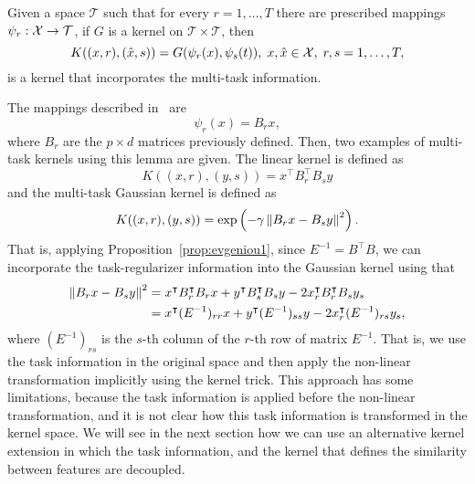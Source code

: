 \begin{lemma}\label{lemma:evgeniou_2}
    Given a space $\mathcal{T}$ such that for every $r=1, \ldots, T$  there are prescribed mappings
    $\psi_r: \mathcal{X} \to \mathcal{T}$, if $G$ is a kernel on $\mathcal{T} \times \mathcal{T}$, then
    \begin{equation}
        \label{eq:evgeniou_lemma2}
        K((x, r), (\hat{x}, s)) = G(\psi_r(x), \psi_s(t)),\; x, \hat{x} \in \Xspace,\; r,s = 1, \ldots, \ntasks ,
    \end{equation}
    is a kernel that incorporates the multi-task information.
\end{lemma}
The mappings described in~\cite{EvgeniouMP05} are
$$ \psi_r(x) = B_r x ,$$
where $B_r$ are the $p \times d$ matrices previously defined.
Then, two examples of multi-task kernels using this lemma are given. The linear kernel is defined as
$$ K((x, r), (y, s)) = x^\intercal B_r^\intercal B_s y $$
and the multi-task Gaussian kernel is defined as
$$ K((x, r), (y, s)) = \exp\left(-\gamma \left\lVert B_r x - B_s y\right\rVert^2 \right) .$$
That is, applying Proposition~\ref{prop:evgeniou1}, since $E^{-1} = B^\intercal B$, we can incorporate the task-regularizer information into the Gaussian kernel using that
\begin{align*}
    \left\lVert B_r x - B_s y\right\rVert^2
     & = x^\intercal B_r^\intercal B_r x + y^\intercal B_s^\intercal B_s y - 2 x_r^\intercal B_r^\intercal B_s y_s \\
     & = x^\intercal (E^{-1})_{rr} x + y^\intercal (E^{-1})_{ss} y - 2 x_r^\intercal (E^{-1})_{rs} y_s ,
\end{align*}
where $(E^{-1})_{rs}$ is the $s$-th column of the $r$-th row of matrix $E^{-1}$.
That is, we use the task information in the original space and then apply the non-linear transformation implicitly using the kernel trick.
%
This approach has some limitations, because the task information is applied before the non-linear transformation, and it is not clear how this task information is transformed in the kernel space.
We will see in the next section how we can use an alternative kernel extension in which the task information, and the kernel that defines the similarity between features are decoupled.


